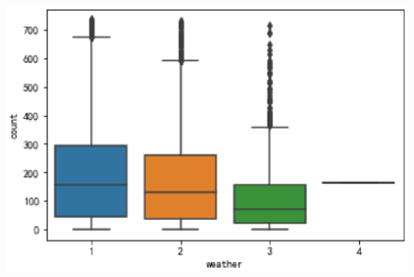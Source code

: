 \begin{center}
  \begin{minipage}{0.7\linewidth}
    \centering
    \includegraphics[height=0.7\textwidth]{pic/weather.eps}
  \end{minipage}
  \hfill
\end{center}

